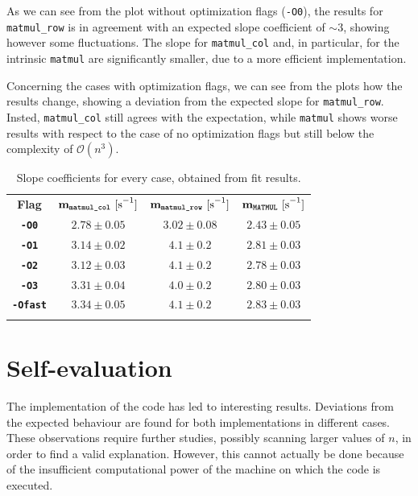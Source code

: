 \documentclass[pra, onecolumn, notitlepage, floats, 11pt]{revtex4-1}
\newcommand{\codebold}[2][cobalt]{\texttt{\bfseries {\color{#1}#2}}}
\newcommand{\code}[2][black]{\color{#1}\texttt{#2}}
\begin{document}
As we can see from the plot without optimization flags (\code{-O0}), the results for \code{matmul\_row} is in agreement with an expected slope coefficient of \( \sim 3 \), showing however some fluctuations. The slope for \code{matmul\_col} and, in particular, for the intrinsic \code{matmul} are significantly smaller, due to a more efficient implementation.

Concerning the cases with optimization flags, we can see from the plots how the results change, showing a deviation from the expected slope for \code{matmul\_row}. Insted, \code{matmul\_col} still agrees with the expectation, while \code{matmul} shows worse results with respect to the case of no optimization flags but still below the complexity of \( \mathcal{O}(n^{3}) \).

\begin{table}[!h]
    \begin{tabular}{|c|c|c|c|}
        \toprule
        \textbf{Flag}   &   \( \mathbf{m}_{\codebold[black]{matmul\_col}} \ \si{[s^{-1}]}\)  &   \( \mathbf{m}_{\codebold[black]{matmul\_row}} \ \si{[s^{-1}]}\)  &   \( \mathbf{m}_{\codebold[black]{MATMUL}} \ \si{[s^{-1}]}\)   \\
        \colrule
        \codebold[black]{-O0}      &   \( 2.78 \pm 0.05 \)   &   \( 3.02 \pm 0.08 \) &   \( 2.43 \pm 0.05 \)   \\
        \codebold[black]{-O1}      &   \( 3.14 \pm 0.02 \)   &   \( 4.1 \pm 0.2 \)   &   \( 2.81 \pm 0.03 \)   \\
        \codebold[black]{-O2}      &   \( 3.12 \pm 0.03 \)   &   \( 4.1 \pm 0.2 \)   &   \( 2.78 \pm 0.03 \)   \\
        \codebold[black]{-O3}      &   \( 3.31 \pm 0.04 \)   &   \( 4.0 \pm 0.2 \)   &   \( 2.80 \pm 0.03 \)   \\
        \codebold[black]{-Ofast}   &   \( 3.34 \pm 0.05 \)   &   \( 4.1 \pm 0.2 \)   &   \( 2.83 \pm 0.03 \)   \\
        \botrule
    \end{tabular}
    \caption{Slope coefficients for every case, obtained from fit results.}
    \label{tab:04_R_12345}
\end{table}





\section{Self-evaluation}
The implementation of the code has led to interesting results. Deviations from the expected behaviour are found for both implementations in different cases. These observations require further studies, possibly scanning larger values of \( n \), in order to find a valid explanation. However, this cannot actually be done because of the insufficient computational power of the machine on which the code is executed.
\end{document}
